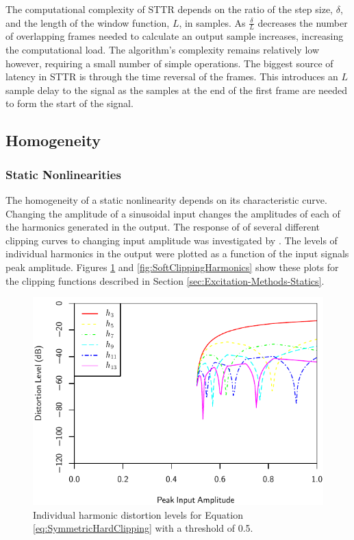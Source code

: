 		The computational complexity of STTR depends on the ratio of the step size, $\delta$, and the length of the
		window function, $L$, in samples. As $\frac{\delta}{L}$ decreases the number of overlapping frames needed to
		calculate an output sample increases, increasing the computational load. The algorithm's complexity remains
		relatively low however, requiring a small number of simple operations. The biggest source of latency in STTR
		is through the time reversal of the frames. This introduces an $L$ sample delay to the signal as the samples
		at the end of the first frame are needed to form the start of the signal.

	\subsection{Homogeneity}
	\label{sec:ExcitationEvaluation-Comparison-Homogeneity}

		\subsubsection*{Static Nonlinearities}
			The homogeneity of a static nonlinearity depends on its characteristic curve. Changing the amplitude
			of a sinusoidal input changes the amplitudes of each of the harmonics generated in the output. The
			response of of several different clipping curves to changing input amplitude was investigated by
			\citet{enderby2012harmonic}. The levels of individual harmonics in the output were plotted as a
			function of the input signals peak amplitude. Figures \ref{fig:HardClippingHarmonics} and
			\ref{fig:SoftClippingHarmonics} show these plots for the clipping functions described in Section
			\ref{sec:Excitation-Methods-Statics}.

			\begin{figure}[h!]
				\centering
				\includegraphics{chapter5/Images/HardClippingHarmonics.pdf}
				\caption{Individual harmonic distortion levels for Equation \ref{eq:SymmetricHardClipping}
					 with a threshold of 0.5.}
				\label{fig:HardClippingHarmonics}
			\end{figure}

